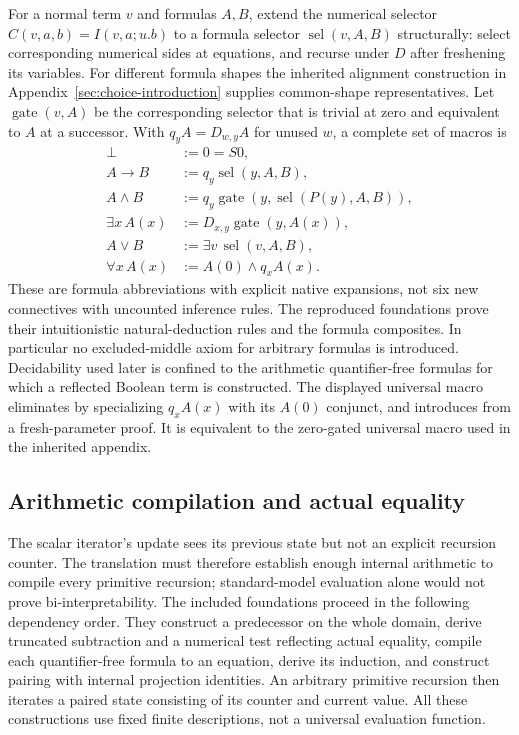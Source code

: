 For a normal term $v$ and formulas $A,B$, extend the numerical selector
$C(v,a,b)=I(v,a;u.b)$ to a formula selector
$\operatorname{sel}(v,A,B)$ structurally: select corresponding numerical
sides at equations, and recurse under $D$ after freshening its variables.
For different formula shapes the inherited alignment construction in
Appendix~\ref{sec:choice-introduction} supplies common-shape representatives.
Let $\operatorname{gate}(v,A)$ be the corresponding selector that is trivial
at zero and equivalent to $A$ at a successor. With
$q_yA=D_{w,y}A$ for unused $w$, a complete set of macros is
\begin{align*}
 \bot &:= 0=S0,\\
 A\to B &:= q_y\operatorname{sel}(y,A,B),\\
 A\wedge B &:= q_y\operatorname{gate}
       (y,\operatorname{sel}(P(y),A,B)),\\
 \exists x\,A(x) &:= D_{x,y}\operatorname{gate}(y,A(x)),\\
 A\vee B &:= \exists v\,\operatorname{sel}(v,A,B),\\
 \forall x\,A(x) &:= A(0)\wedge q_x A(x).
\end{align*}
These are formula abbreviations with explicit native expansions, not six
new connectives with uncounted inference rules. The reproduced foundations
prove their intuitionistic natural-deduction rules and the formula
composites. In particular no excluded-middle axiom for arbitrary formulas
is introduced. Decidability used later is confined to the arithmetic
quantifier-free formulas for which a reflected Boolean term is constructed.
The displayed universal macro eliminates by specializing $q_xA(x)$ with
its $A(0)$ conjunct, and introduces from a fresh-parameter proof. It is
equivalent to the zero-gated universal macro used in the inherited appendix.

\subsection{Arithmetic compilation and actual equality}

The scalar iterator's update sees its previous state but not an explicit
recursion counter. The translation must therefore establish enough internal
arithmetic to compile every primitive recursion; standard-model evaluation
alone would not prove bi-interpretability. The included foundations proceed
in the following dependency order. They construct a predecessor on the whole
domain, derive truncated subtraction and a numerical test reflecting actual
equality, compile each quantifier-free formula to an equation, derive its
induction, and construct pairing with internal projection identities.
An arbitrary primitive recursion then iterates a paired state consisting of
its counter and current value. All these constructions use fixed finite
descriptions, not a universal evaluation function.

